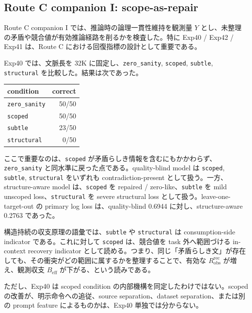 \documentclass[12pt,a4paper]{article}
\begin{document}
\subsection{Route C companion I: scope-as-repair}\label{route-c-companion-i-scope-as-repair}

Route C companion I では、推論時の論理一貫性維持を観測量 \(Y\) とし、未整理の矛盾や競合値が有効推論経路を削るかを検査した。特に Exp40 / Exp42 / Exp41 は、Route C における回復指標の設計として重要である。

Exp40 では、文脈長を 32K に固定し、\texttt{zero\_sanity}, \texttt{scoped}, \texttt{subtle}, \texttt{structural} を比較した。結果は次であった。

{\def\LTcaptype{table} %
\begin{longtable}[]{@{}lr@{}}
\toprule\noalign{}
condition & correct \\
\midrule\noalign{}
\endhead
\bottomrule\noalign{}
\endlastfoot
\texttt{zero\_sanity} & 50/50 \\
\texttt{scoped} & 50/50 \\
\texttt{subtle} & 23/50 \\
\texttt{structural} & 0/50 \\
\end{longtable}
}

ここで重要なのは、\texttt{scoped} が矛盾らしき情報を含むにもかかわらず、\texttt{zero\_sanity} と同水準に戻った点である。quality-blind model は \texttt{scoped}, \texttt{subtle}, \texttt{structural} をいずれも contradiction-present として扱う。一方、structure-aware model は、\texttt{scoped} を repaired / zero-like、\texttt{subtle} を mild unscoped loss、\texttt{structural} を severe structural loss として扱う。leave-one-target-out の primary log loss は、quality-blind 0.6944 に対し、structure-aware 0.2763 であった。

構造持続の収支原理の語彙では、\texttt{subtle} や \texttt{structural} は consumption-side indicator である。これに対して \texttt{scoped} は、競合値を task 外へ範囲づける in-context recovery indicator として読める。つまり、同じ「矛盾らしき文」が存在しても、その衝突がどの範囲に属するかを整理することで、有効な \(R_{\mathrm{obs}}^{\mathrm{rec}}\) が増え、観測収支 \(B_{\mathrm{eff}}\) が下がる、という読みである。

ただし、Exp40 は scoped condition の内部機構を同定したわけではない。scoped の改善が、明示命令への追従、source separation、dataset separation、または別の prompt feature によるものかは、Exp40 単独では分からない。
\end{document}
